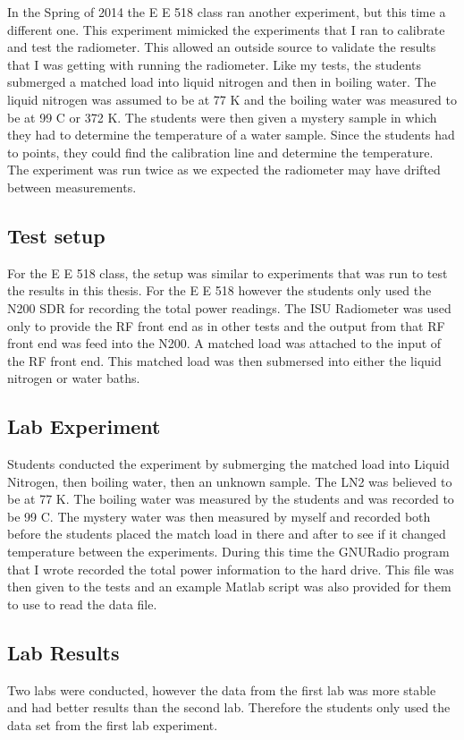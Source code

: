 In the Spring of 2014 the E E 518 class ran another experiment, but this time a different one.  This experiment mimicked the experiments that I ran to calibrate and test the radiometer.  This allowed an outside source to validate the results that I was getting with running the radiometer.  Like my tests, the students submerged a matched load into liquid nitrogen and then in boiling water.  The liquid nitrogen was assumed to be at 77 K and the boiling water was measured to be at 99 C or 372 K.  The students were then given a mystery sample in which they had to determine the temperature of a water sample.  Since the students had to points, they could find the calibration line and determine the temperature.  The experiment was run twice as we expected the radiometer may have drifted between measurements.  

\subsection{Test setup}
For the E E 518 class, the setup was similar to experiments that was run to test the results in this thesis.  For the E E 518 however the students only used the N200 SDR for recording the total power readings.  The ISU Radiometer was used only to provide the RF front end as in other tests and the output from that RF front end was feed into the N200.  A matched load was attached to the input of the RF front end.  This matched load was then submersed into either the liquid nitrogen or water baths.  

\subsection{Lab Experiment}

Students conducted the experiment by submerging the matched load into Liquid Nitrogen, then boiling water, then an unknown sample.  The LN2 was believed to be at 77 K.  The boiling water was measured by the students and was recorded to be 99 C.  The mystery water was then measured by myself and recorded both before the students placed the match load in there and after to see if it changed temperature between the experiments.  During this time the GNURadio program that I wrote recorded the total power information to the hard drive.  This file was then given to the tests and an example Matlab script was also provided for them to use to read the data file.

\subsection{Lab Results}

Two labs were conducted, however the data from the first lab was more stable and had better results than the second lab.  Therefore the students only used the data set from the first lab experiment.  